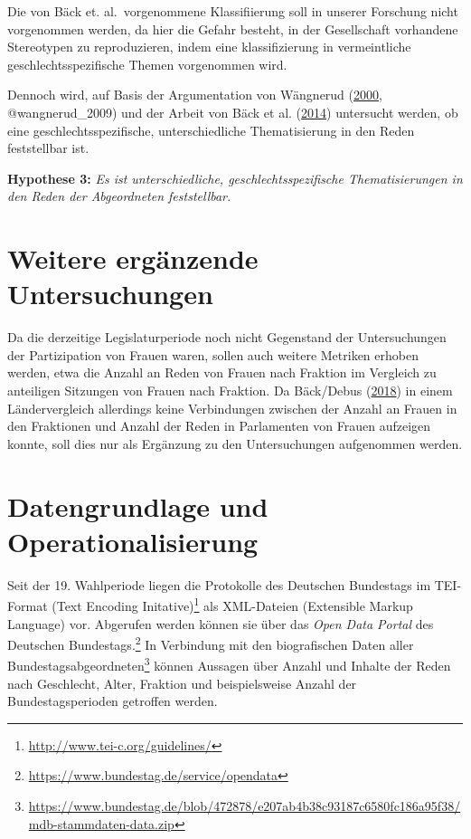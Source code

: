\documentclass[12pt,ngerman,]{article}
\begin{document}
Die von Bäck et. al.~vorgenommene Klassifiierung soll in unserer
Forschung nicht vorgenommen werden, da hier die Gefahr besteht, in der
Gesellschaft vorhandene Stereotypen zu reproduzieren, indem eine
klassifizierung in vermeintliche geschlechtsspezifische Themen
vorgenommen wird.

Dennoch wird, auf Basis der Argumentation von Wängnerud
(\protect\hyperlink{ref-wangnerud_2000}{2000}, @wangnerud\_2009) und der
Arbeit von Bäck et al. (\protect\hyperlink{ref-back_2014}{2014})
untersucht werden, ob eine geschlechtsspezifische, unterschiedliche
Thematisierung in den Reden feststellbar ist.

\textbf{Hypothese 3:} \emph{Es ist unterschiedliche,
geschlechtsspezifische Thematisierungen in den Reden der Abgeordneten
feststellbar.}

\hypertarget{weitere-erganzende-untersuchungen}{%
\section{Weitere ergänzende
Untersuchungen}\label{weitere-erganzende-untersuchungen}}

Da die derzeitige Legislaturperiode noch nicht Gegenstand der
Untersuchungen der Partizipation von Frauen waren, sollen auch weitere
Metriken erhoben werden, etwa die Anzahl an Reden von Frauen nach
Fraktion im Vergleich zu anteiligen Sitzungen von Frauen nach Fraktion.
Da Bäck/Debus (\protect\hyperlink{ref-back_2018}{2018}) in einem
Ländervergleich allerdings keine Verbindungen zwischen der Anzahl an
Frauen in den Fraktionen und Anzahl der Reden in Parlamenten von Frauen
aufzeigen konnte, soll dies nur als Ergänzung zu den Untersuchungen
aufgenommen werden.

\pagebreak

\hypertarget{datengrundlage-und-operationalisierung}{%
\section{Datengrundlage und
Operationalisierung}\label{datengrundlage-und-operationalisierung}}

Seit der 19. Wahlperiode liegen die Protokolle des Deutschen Bundestags
im TEI-Format (Text Encoding Initative)\footnote{\url{http://www.tei-c.org/guidelines/}}
als XML-Dateien (Extensible Markup Language) vor. Abgerufen werden
können sie über das \emph{Open Data Portal} des Deutschen
Bundestags.\footnote{\url{https://www.bundestag.de/service/opendata}} In
Verbindung mit den biografischen Daten aller
Bundestagsabgeordneten\footnote{\url{https://www.bundestag.de/blob/472878/e207ab4b38c93187c6580fc186a95f38/mdb-stammdaten-data.zip}}
können Aussagen über Anzahl und Inhalte der Reden nach Geschlecht,
Alter, Fraktion und beispielsweise Anzahl der Bundestagsperioden
getroffen werden.
\end{document}
